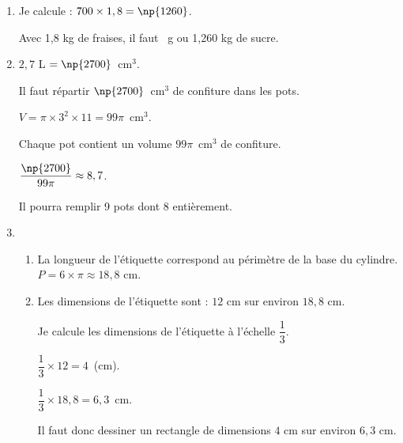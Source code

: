 
\medskip

\begin{enumerate}
\item Je calcule : $700 \times 1,8 = \np{1260}$.

Avec 1,8 kg de fraises, il faut ~g ou 1,260 kg de sucre.
\item $2,7$ L $= \np{2700}$~cm$^3$.

Il faut répartir $\np{2700}$~cm$^3$ de confiture dans les pots.

$V = \pi \times 3^2 \times 11 = 99\pi$~cm$^3$.

Chaque pot contient un volume $99\pi$~cm$^3$ de confiture.

$\dfrac{\np{2700}}{99\pi} \approx  8,7$.

Il pourra remplir 9 pots dont 8 entièrement.
\item 
	\begin{enumerate}
		\item La longueur de l'étiquette correspond au périmètre de la base du cylindre.
$P = 6 \times  \pi \approx  18,8$ cm.
		\item Les dimensions de l'étiquette sont : $12$ cm sur environ $18,8$ cm.

Je calcule les dimensions de l'étiquette à l'échelle $\dfrac{1}{3}$.

$\dfrac{1}{3} \times 12 = 4$~(cm).

$\dfrac{1}{3} \times 18,8 = 6,3$~cm.

Il faut donc dessiner un rectangle de dimensions $4$ cm sur environ $6,3$ cm.
 	\end{enumerate}
\end{enumerate}
